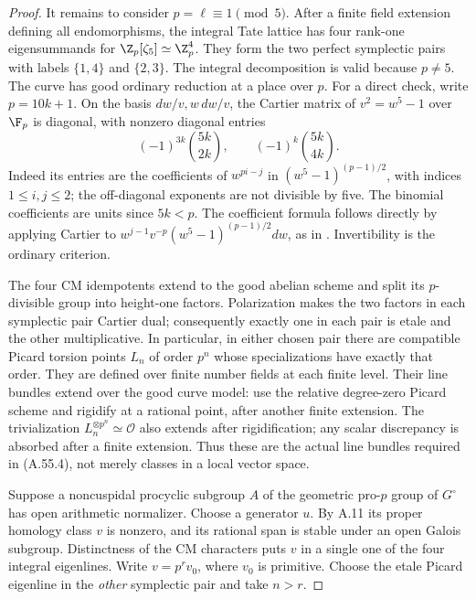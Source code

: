 \begin{proof}
It remains to consider \(p=\ell\equiv1\pmod5\).
After a finite field extension defining all endomorphisms, the
integral Tate lattice has four rank-one eigensummands for
\(\Z_p[\zeta_5]\simeq\Z_p^4\). They form the two perfect
symplectic pairs with labels \(\{1,4\}\) and \(\{2,3\}\).
The integral decomposition is valid because \(p\ne5\).
The curve has good ordinary reduction at a place over \(p\).
For a direct check, write \(p=10k+1\). On the basis
\(dw/v,w\,dw/v\), the Cartier matrix of \(v^2=w^5-1\)
over \(\F_p\) is diagonal, with nonzero diagonal entries
\[
        (-1)^{3k}\binom{5k}{2k},\qquad
        (-1)^k\binom{5k}{4k}.                         \tag{A.55.7}
\]
Indeed its entries are the coefficients of \(w^{pi-j}\)
in \((w^5-1)^{(p-1)/2}\), with indices \(1\le i,j\le2\);
the off-diagonal exponents are not divisible by five. The
binomial coefficients are units since \(5k<p\).
The coefficient formula follows directly by applying Cartier
to \(w^{j-1}v^{-p}(w^5-1)^{(p-1)/2}dw\), as in
\cite[Section 3, pp.5--6]{fghAchterHowe2017}.
Invertibility is the ordinary criterion.

The four CM idempotents extend to the good abelian scheme and
split its \(p\)-divisible group into height-one factors.
Polarization makes the two factors in each symplectic pair
Cartier dual; consequently exactly one in each pair is etale
and the other multiplicative. In particular, in either chosen
pair there are compatible Picard torsion points \(L_n\) of
order \(p^n\) whose specializations have exactly that order.
They are defined over finite number fields at each finite
level. Their line bundles extend over the good curve model:
use the relative degree-zero Picard scheme and rigidify at a
rational point, after another finite extension. The trivialization
\(L_n^{\otimes p^n}\simeq\mathcal O\) also extends after
rigidification; any scalar discrepancy is absorbed after a
finite extension. Thus these are the actual line bundles
required in (A.55.4), not merely classes in a local vector space.

Suppose a noncuspidal procyclic subgroup \(A\) of the
geometric pro-\(p\) group of \(G^\circ\) has open arithmetic
normalizer. Choose a generator \(u\). By A.11 its proper
homology class \(v\) is nonzero, and its rational span is
stable under an open Galois subgroup. Distinctness of the CM
characters puts \(v\) in a single one of the four integral
eigenlines. Write \(v=p^r v_0\), where \(v_0\) is primitive.
Choose the etale Picard eigenline in the \emph{other} symplectic
pair and take \(n>r\).


\end{proof}
